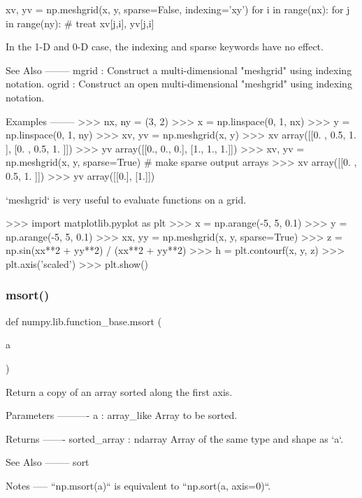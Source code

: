 \begin{DoxyVerb}
    xv, yv = np.meshgrid(x, y, sparse=False, indexing='xy')
    for i in range(nx):
        for j in range(ny):
            # treat xv[j,i], yv[j,i]

In the 1-D and 0-D case, the indexing and sparse keywords have no effect.

See Also
--------
mgrid : Construct a multi-dimensional "meshgrid" using indexing notation.
ogrid : Construct an open multi-dimensional "meshgrid" using indexing
        notation.

Examples
--------
>>> nx, ny = (3, 2)
>>> x = np.linspace(0, 1, nx)
>>> y = np.linspace(0, 1, ny)
>>> xv, yv = np.meshgrid(x, y)
>>> xv
array([[0. , 0.5, 1. ],
       [0. , 0.5, 1. ]])
>>> yv
array([[0.,  0.,  0.],
       [1.,  1.,  1.]])
>>> xv, yv = np.meshgrid(x, y, sparse=True)  # make sparse output arrays
>>> xv
array([[0. ,  0.5,  1. ]])
>>> yv
array([[0.],
       [1.]])

`meshgrid` is very useful to evaluate functions on a grid.

>>> import matplotlib.pyplot as plt
>>> x = np.arange(-5, 5, 0.1)
>>> y = np.arange(-5, 5, 0.1)
>>> xx, yy = np.meshgrid(x, y, sparse=True)
>>> z = np.sin(xx**2 + yy**2) / (xx**2 + yy**2)
>>> h = plt.contourf(x, y, z)
>>> plt.axis('scaled')
>>> plt.show()\end{DoxyVerb}
 \mbox{\label{namespacenumpy_1_1lib_1_1function__base_a9d1bb717d2bf83599bec71b70ca2b47c}} 
\subsubsection{\texorpdfstring{msort()}{msort()}}
{\footnotesize\ttfamily def numpy.\+lib.\+function\+\_\+base.\+msort (\begin{DoxyParamCaption}\item[{}]{a }\end{DoxyParamCaption})}

\begin{DoxyVerb}Return a copy of an array sorted along the first axis.

Parameters
----------
a : array_like
    Array to be sorted.

Returns
-------
sorted_array : ndarray
    Array of the same type and shape as `a`.

See Also
--------
sort

Notes
-----
``np.msort(a)`` is equivalent to  ``np.sort(a, axis=0)``.\end{DoxyVerb}
 \mbox{\label{namespacenumpy_1_1lib_1_1function__base_a083d9311a05ef68c201c1b4d8e30825d}} 
